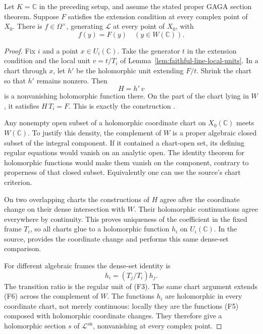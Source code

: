 \begin{srproposition}
\label{prop:faithful-complex-flat-generator}
Let \(K=\mathbb C\) in the preceding setup, and assume the stated
proper GAGA section theorem.  Suppose \(F\) satisfies the extension
condition at every complex point of \(X_0\).
There is \(f\in\Omega^\times\), generating \(\mathcal L\) at every
point of \(X_0\), with
\[
                           f(y)=F(y)\quad(y\in W(\mathbb C)).
 \tag{F4}\label{eq:faithful-complex-flat-generator}
\]
\end{srproposition}
\begin{proof}
Fix \(i\) and a point \(x\in U_i(\mathbb C)\).
Take the generator \(t\) in the extension condition and the local
unit \(v=t/T_i\) of Lemma~\ref{lem:faithful-line-local-units}.
In a chart through \(x\), let \(h'\) be the holomorphic unit extending
\(F/t\).  Shrink the chart so that \(h'\) remains nonzero.
Then
\[
                              H=h'\,v
 \tag{F5}\label{eq:faithful-hchart}
\]
is a nonvanishing holomorphic function there.
On the part of the chart lying in \(W\), it satisfies
\(H\,T_i=F\).
This is exactly the construction
.

Any nonempty open subset of a holomorphic coordinate chart on
\(X_0(\mathbb C)\) meets \(W(\mathbb C)\).
To justify this density, the complement of \(W\) is a proper
algebraic closed subset of the integral component.
If it contained a chart-open set, its defining regular equations
would vanish on an analytic open.  The identity theorem for
holomorphic functions would make them vanish on the component,
contrary to properness of that closed subset.
Equivalently one can use the source's
 chart criterion.

On two overlapping charts the constructions of \(H\) agree after
the coordinate change on their dense intersection with \(W\).
Their holomorphic continuations agree everywhere by continuity.
This proves uniqueness of the coefficient in the fixed frame
\(T_i\), so all charts glue to a holomorphic function \(h_i\)
on \(U_i(\mathbb C)\).
In the source,  provides the coordinate
change and  performs this
same dense-set comparison.

For different algebraic frames the dense-set identity is
\[
                      h_i=(T_j/T_i)h_j.
 \tag{F6}\label{eq:faithful-hchart-transition}
\]
The transition ratio is the regular unit of (F3).
The same chart argument extends (F6) across the complement of \(W\).
The functions \(h_i\) are holomorphic in every coordinate chart,
not merely continuous: locally they are the functions (F5)
composed with holomorphic coordinate changes.
They therefore give a holomorphic section \(s\) of
\(\mathcal L^{\mathrm{an}}\), nonvanishing at every complex point.


\end{proof}
